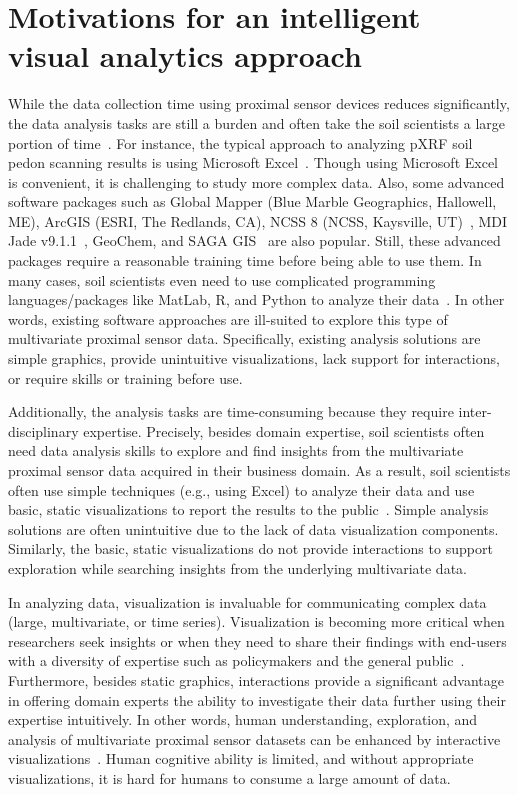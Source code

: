 \section{Motivations for an intelligent visual analytics approach}

While the data collection time using proximal sensor devices reduces significantly, the data analysis tasks are still a burden and often take the soil scientists a large portion of time~\cite{pham2019soaviz}. For instance, the typical approach to analyzing pXRF soil pedon scanning results is using Microsoft Excel~\cite{Zhu2011}. Though using Microsoft Excel is convenient, it is challenging to study more complex data. Also, some advanced software packages such as Global Mapper (Blue Marble Geographics, Hallowell, ME), ArcGIS (ESRI, The Redlands, CA), NCSS 8 (NCSS, Kaysville, UT)~\cite{Paulette2015,Guilherme2018}, MDI Jade v9.1.1~\cite{Chakraborty2017}, GeoChem, and SAGA GIS~\cite{Curi2018} are also popular. Still, these advanced packages require a reasonable training time before being able to use them. In many cases, soil scientists even need to use complicated programming languages/packages like MatLab, R, and Python to analyze their data~\cite{Wesseling2013}. In other words, existing software approaches are ill-suited to explore this type of multivariate proximal sensor data. Specifically, existing analysis solutions are simple graphics, provide unintuitive visualizations, lack support for interactions, or require skills or training before use.

Additionally, the analysis tasks are time-consuming because they require inter-disciplinary expertise. Precisely, besides domain expertise, soil scientists often need data analysis skills to explore and find insights from the multivariate proximal sensor data acquired in their business domain. As a result, soil scientists often use simple techniques (e.g., using Excel) to analyze their data and use basic, static visualizations to report the results to the public~\cite{pham2020soilscanner}. Simple analysis solutions are often unintuitive due to the lack of data visualization components. Similarly, the basic, static visualizations do not provide interactions to support exploration while searching insights from the underlying multivariate data.

In analyzing data, visualization is invaluable for communicating complex data (large, multivariate, or time series). Visualization is becoming more critical when researchers seek insights or when they need to share their findings with end-users with a diversity of expertise such as policymakers and the general public~\cite{theriot2020tailoring}. Furthermore, besides static graphics, interactions provide a significant advantage in offering domain experts the ability to investigate their data further using their expertise intuitively. In other words, human understanding, exploration, and analysis of multivariate proximal sensor datasets can be enhanced by interactive visualizations~\cite{balla2017possibilities}. Human cognitive ability is limited, and without appropriate visualizations, it is hard for humans to consume a large amount of data.

